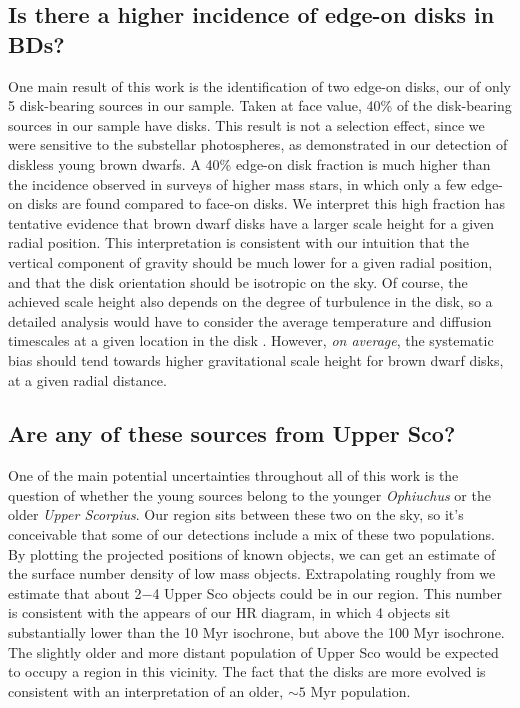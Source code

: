 \subsection{Is there a higher incidence of edge-on disks in BDs?}
One main result of this work is the identification of two  edge-on disks, our of only 5 disk-bearing sources in our sample.  Taken at face value, 40\% of the disk-bearing sources in our sample have disks.  This result is not a selection effect, since we were sensitive to the substellar photospheres, as demonstrated in our detection of diskless young brown dwarfs.  A 40\% edge-on disk fraction is much higher than the incidence observed in surveys of higher mass stars, in which only a few edge-on disks are found compared to face-on disks.  We interpret this high fraction has tentative evidence that brown dwarf disks have a larger scale height for a given radial position.  This interpretation is consistent with our intuition that the vertical component of gravity should be much lower for a given radial position, and that the disk orientation should be isotropic on the sky.  Of course, the achieved scale height also depends on the degree of turbulence in the disk, so a detailed analysis would have to consider the average temperature and diffusion timescales at a given location in the disk \citep{2012A&A...539A...9M,2009MNRAS.394L.141E}.  However, \emph{on average}, the systematic bias should tend towards higher gravitational scale height for brown dwarf disks, at a given radial distance.

\subsection{Are any of these sources from Upper Sco?}

One of the main potential uncertainties throughout all of this work is the question of whether the young sources belong to the younger \emph{Ophiuchus} or the older \emph{Upper Scorpius}.  Our region sits between these two on the sky, so it's conceivable that some of our detections include a mix of these two populations.  By plotting the projected positions of known objects, we can get an estimate of the surface number density of low mass objects.  Extrapolating roughly from \citet{2006AJ....131.3016S,2012ApJ...758...31L} we estimate that about 2$-$4 Upper Sco objects could be in our region.  This number is consistent with the appears of our HR diagram, in which 4 objects sit substantially lower than the 10 Myr isochrone, but above the 100 Myr isochrone.  The slightly older and more distant population of Upper Sco would be expected to occupy a region in this vicinity.  The fact that the disks are more evolved is consistent with an interpretation of an older, $\sim5$ Myr population.

